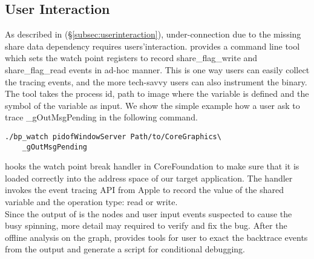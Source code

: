 
\subsection{User Interaction}\label{subsec:tcp}

As described in (\S\ref{subsec:userinteraction}), under-connection due
to the missing share data dependency requires users'interaction. \xxx
provides a command line tool which sets the watch point registers to record
share\_flag\_write and share\_flag\_read events in ad-hoc manner. This is one
way users can easily collect the tracing events, and the more tech-savvy users
can also instrument the binary. The tool takes the process id, path to image
where the variable is defined and the symbol of the variable as input. We
show the simple example how a user ask \xxx to trace \_gOutMsgPending in the
following command.

\begin{lstlisting}
./bp_watch pidofWindowServer Path/to/CoreGraphics\
	_gOutMsgPending
\end{lstlisting}

\xxx hooks the watch point break handler in CoreFoundation to make sure that it is
loaded correctly into the address space of our target application. The handler
invokes the event tracing API from Apple to record the value of the shared
variable and the operation type: read or write.
\\
Since the output of \xxx is the nodes and user input events suspected to cause
the busy spinning, more detail may required to verify and fix the bug. After
the offline analysis on the graph, \xxx provides tools for user to exact
the backtrace events from the output and generate a script for conditional
debugging.

